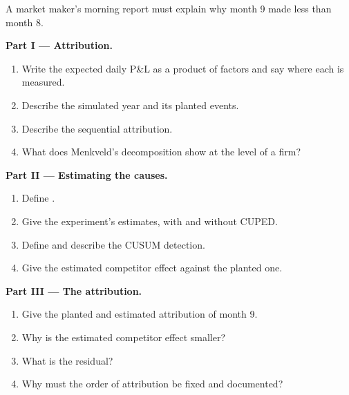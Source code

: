 \begin{problem}\label{pb:hf:pnl-analytics-and-the-strategy-lifecycle:1}
A market maker's morning report must explain why month 9 made less than month 8.

\medskip\noindent\textbf{Part I --- Attribution.}
\begin{enumerate}
\item Write the expected daily P\&L as a product of factors and say where each is measured.
\item Describe the simulated year and its planted events.
\item Describe the sequential attribution.
\item What does Menkveld's decomposition show at the level of a firm?
\end{enumerate}

\medskip\noindent\textbf{Part II --- Estimating the causes.}
\begin{enumerate}[resume]
\item Define .
\item Give the experiment's estimates, with and without CUPED.
\item Define  and describe the CUSUM detection.
\item Give the estimated competitor effect against the planted one.
\end{enumerate}

\medskip\noindent\textbf{Part III --- The attribution.}
\begin{enumerate}[resume]
\item Give the planted and estimated attribution of month 9.
\item Why is the estimated competitor effect smaller?
\item What is the residual?
\item Why must the order of attribution be fixed and documented?
\end{enumerate}


\end{problem}
